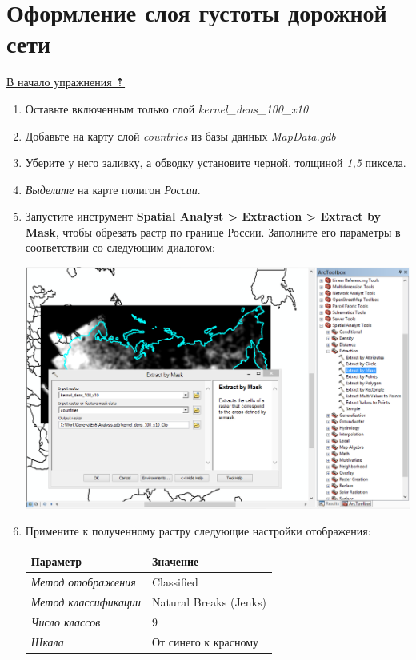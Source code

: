 \documentclass[]{book}
\theoremstyle{definition}
\theoremstyle{definition}
\theoremstyle{definition}
\theoremstyle{remark}
\begin{document}
\hypertarget{density-analysis-layer}{%
\section{Оформление слоя густоты дорожной
сети}\label{density-analysis-layer}}

\protect\hyperlink{density-analysis}{В начало упражнения ⇡}

\begin{enumerate}
\def\labelenumi{\arabic{enumi}.}
\item
  Оставьте включенным только слой \emph{kernel\_dens\_100\_x10}
\item
  Добавьте на карту слой \emph{countries} из базы данных
  \emph{MapData.gdb}
\item
  Уберите у него заливку, а обводку установите черной, толщиной
  \emph{1,5} пиксела.
\item
  \emph{Выделите} на карте полигон \emph{России}.
\item
  Запустите инструмент \textbf{Spatial Analyst \textgreater{} Extraction
  \textgreater{} Extract by Mask}, чтобы обрезать растр по границе
  России. Заполните его параметры в соответствии со следующим диалогом:

  \includegraphics{images/Ex15/image15.png}
\item
  Примените к полученному растру следующие настройки отображения:

  \begin{longtable}[]{@{}ll@{}}
  \toprule
  Параметр & Значение\tabularnewline
  \midrule
  \endhead
  \emph{Метод отображения} & Classified\tabularnewline
  \emph{Метод классификации} & Natural Breaks (Jenks)\tabularnewline
  \emph{Число классов} & 9\tabularnewline
  \emph{Шкала} & От синего к красному\tabularnewline
  \bottomrule
  \end{longtable}


\end{enumerate}
\end{document}
